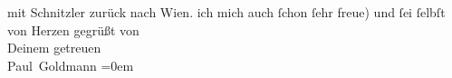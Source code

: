\begin{ledgroupsized}[t]{13cm}
{{{                  mit Schnitzler zurück nach Wien.}}}\label{K_L03363-4h} ich mich auch ſchon ſehr freue) und ſei ſelbſt
               von Herzen gegrüßt von {\\[\baselineskip]}Deinem getreuen {\\[\baselineskip]}\spacefill\mbox{Paul Goldmann}\pend
           \leftskip=0em{}
         
         \endnumbering{}\end{ledgroupsized}\begin{anhang}\end{anhang}\newcommand{\dateiname}{L03363}\newcommand{\titel}{Paul Goldmann an Arthur Schnitzler, 17. 2. [1903]}\newcommand{\editorInnen}{Martin Anton Müller und Laura Untner}
      